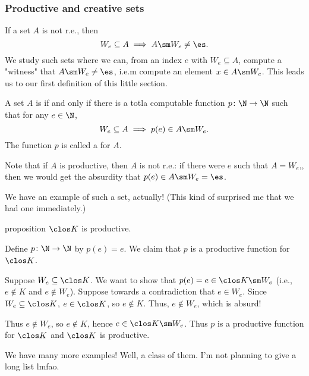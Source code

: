 \documentclass[class=article, crop=false]{standalone}
\begin{document}
\subsubsection{Productive and creative sets}

If a set $A$ is not r.e., then
  \[
    W_e \subseteq A \implies A \sm W_e \neq \es.
  \]
We study such sets where we can, from an index $e$ with $W_e \subseteq A$, compute a "witness" that $A \sm W_e \neq \es$, i.e.m compute an element $x \in A \sm W_e$. This leads us to our first definition of this little section.

\begin{defn}
  A set $A$ is  if and only if there is a totla computable function $p\colon \N \to \N$ such that for any $e \in \N$,
    \[
      W_e \subseteq A \implies p(e) \in A \sm W_e.
    \]
  The function $p$ is called a  for $A$.
\end{defn}
\begin{rem}
  Note that if $A$ is productive, then $A$ is not r.e.: if there were $e$ such that $A= W_e$,, then we would get the absurdity that $p(e) \in A \sm W_e = \es$.
\end{rem}

We have an example of such a set, actually! (This kind of surprised me that we had one immediately.)

\begin{result}{proposition}
  $\clos K$ is productive.
\end{result}
\begin{pf}
  Define $p\colon \N \to \N$ by $p(e)=e$. We claim that $p$ is a productive function for $\clos K$.

  Suppose $W_e \subseteq \clos K$. We want to show that $p(e)= e \in \clos K \sm W_e$ (i.e., $e \nin K$ and $e \nin W_e$). Suppose towards a contradiction that $e \in W_e$. Since $W_e \subseteq \clos K$, $e \in \clos K$, so $e \nin K$. Thus, $e \nin W_e$, which is absurd!

  Thus $e \nin W_e$, so $e \nin K$, hence $e \in \clos K \sm W_e$. Thus $p$ is a productive function for $\clos K$ and $\clos K$ is productive.
\end{pf}

We have many more examples! Well, a class of them. I'm not planning to give a long list lmfao.
\end{document}
